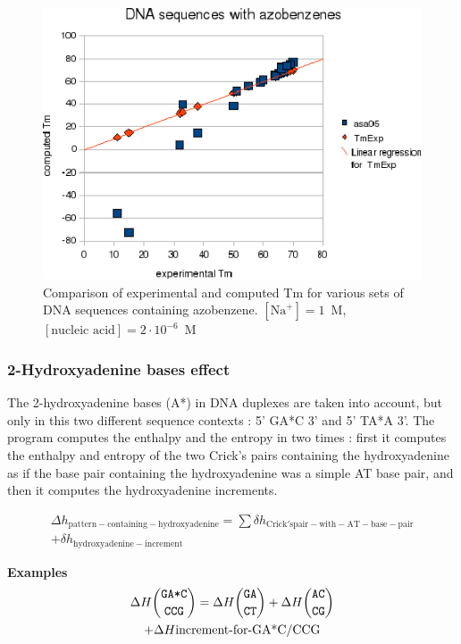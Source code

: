 \documentclass{article}
\begin{document}
\begin{figure}[h]
\includegraphics[width=1\linewidth]{images/Azobenzene}
\caption{Comparison of experimental and computed Tm for various sets of
 DNA sequences containing azobenzene. $[\mbox{Na}^+] = 1$~M, $[\mbox{nucleic acid}] = 2\cdot{}10^{-6}$~M}
\end{figure}

\pagebreak
\subsubsection{2-Hydroxyadenine bases effect}

The 2-hydroxyadenine bases (A*) in DNA duplexes are taken into account, but only in this two different
sequence contexts : 5' GA*C 3' and 5' TA*A 3'. The program computes the enthalpy and the entropy in two
times : first it computes the enthalpy and entropy of the two Crick's pairs containing the hydroxyadenine
as if the base pair containing the hydroxyadenine was a simple AT base pair, and then it computes the hydroxyadenine
increments.

\begin{multline*}
\Delta{}h_\mathrm{pattern-containing-hydroxyadenine} =
\sum \delta{}h_\mathrm{Crick's pair-with-AT-base-pair} \\ +
\delta{}h_\mathrm{hydroxyadenine-increment}
\end{multline*}

\textbf{Examples}
\begin{multline*}
\Delta H {\mbox{\texttt{GA*C}} \choose \mbox{\texttt{CCG}}} = 
\Delta H {\mbox{\texttt{GA}} \choose \mbox{\texttt{CT}}} +
\Delta H {\mbox{\texttt{AC}} \choose \mbox{\texttt{CG}}} \\ +
\Delta H {\mbox{increment-for-GA*C/CCG}}\\
\end{multline*}
\end{document}
